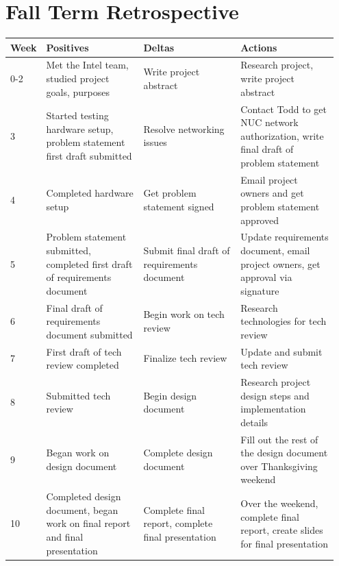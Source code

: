 \documentclass[10pt,onecolumn,journal,draftclsnofoot]{IEEEtran}
\begin{document}
\section{Fall Term Retrospective}

\begin{center}
	\begin{tabular}{| p{0.05\linewidth} | p{0.3\linewidth} | p{0.3\linewidth} |
			p{0.3\linewidth} |}\hline
		Week & Positives & Deltas & Actions \\ \hline

		0-2 & Met the Intel team, studied project goals, purposes  &
			Write project abstract & Research project, write project
			abstract \\ \hline

		3 & Started testing hardware setup, problem statement
			first draft submitted & Resolve networking issues & 
			Contact Todd to get NUC network authorization, write
			final draft of problem statement\\ \hline

		4 & Completed hardware setup  & Get problem statement signed  &
			Email project owners and get problem statement approved
			\\ \hline

		5 & Problem statement submitted, completed first draft
			of requirements document & Submit final draft of
			requirements document & Update requirements document,
			email project owners, get approval via signature \\ 
			\hline

		6 & Final draft of requirements document submitted & Begin work
			on tech review & Research technologies for tech review 
			\\ \hline

		7 & First draft of tech review completed & Finalize tech review
			& Update and submit tech review \\ \hline

		8 & Submitted tech review & Begin design document & Research 
			project design steps and implementation details\\ \hline
		
		9 & Began work on design document & Complete design document  &
			Fill out the rest of the design document over 
			Thanksgiving weekend \\ \hline

		10 & Completed design document, began work on final report and
			final presentation & Complete final report, complete
			final presentation & Over the weekend, complete final
			report, create slides for final presentation\\ \hline

	\end{tabular}
\end{center}
\end{document}
